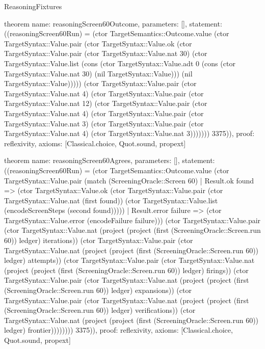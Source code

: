 \begin{lexlean}{ReasoningFixtures}
\begin{semanticmodule}
theorem{
  name: reasoningScreen60Outcome,
  parameters: [],
  statement: ((reasoningScreen60Run) = (ctor TargetSemantics::Outcome.value (ctor TargetSyntax::Value.pair (ctor TargetSyntax::Value.ok (ctor TargetSyntax::Value.pair (ctor TargetSyntax::Value.nat 30) (ctor TargetSyntax::Value.list (cons (ctor TargetSyntax::Value.adt 0 (cons (ctor TargetSyntax::Value.nat 30) (nil TargetSyntax::Value))) (nil TargetSyntax::Value))))) (ctor TargetSyntax::Value.pair (ctor TargetSyntax::Value.nat 4) (ctor TargetSyntax::Value.pair (ctor TargetSyntax::Value.nat 12) (ctor TargetSyntax::Value.pair (ctor TargetSyntax::Value.nat 4) (ctor TargetSyntax::Value.pair (ctor TargetSyntax::Value.nat 3) (ctor TargetSyntax::Value.pair (ctor TargetSyntax::Value.nat 4) (ctor TargetSyntax::Value.nat 3))))))) 3375)),
  proof: reflexivity{},
  axioms: [Classical.choice, Quot.sound, propext]
}

theorem{
  name: reasoningScreen60Agrees,
  parameters: [],
  statement: ((reasoningScreen60Run) = (ctor TargetSemantics::Outcome.value (ctor TargetSyntax::Value.pair (match (ScreeningOracle::Screen 60)
    | Result.ok found => (ctor TargetSyntax::Value.ok (ctor TargetSyntax::Value.pair (ctor TargetSyntax::Value.nat (first found)) (ctor TargetSyntax::Value.list (encodeScreenSteps (second found)))))
    | Result.error failure => (ctor TargetSyntax::Value.error (encodeFailure failure))) (ctor TargetSyntax::Value.pair (ctor TargetSyntax::Value.nat (project (project (first (ScreeningOracle::Screen.run 60)) ledger) iterations)) (ctor TargetSyntax::Value.pair (ctor TargetSyntax::Value.nat (project (project (first (ScreeningOracle::Screen.run 60)) ledger) attempts)) (ctor TargetSyntax::Value.pair (ctor TargetSyntax::Value.nat (project (project (first (ScreeningOracle::Screen.run 60)) ledger) firings)) (ctor TargetSyntax::Value.pair (ctor TargetSyntax::Value.nat (project (project (first (ScreeningOracle::Screen.run 60)) ledger) expansions)) (ctor TargetSyntax::Value.pair (ctor TargetSyntax::Value.nat (project (project (first (ScreeningOracle::Screen.run 60)) ledger) verifications)) (ctor TargetSyntax::Value.nat (project (project (first (ScreeningOracle::Screen.run 60)) ledger) frontier)))))))) 3375)),
  proof: reflexivity{},
  axioms: [Classical.choice, Quot.sound, propext]
}


\end{semanticmodule}
\end{lexlean}
